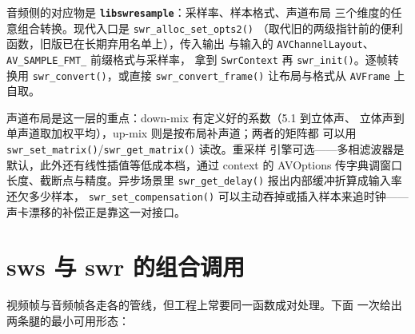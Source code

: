 \documentclass[12pt,a4paper,fontset=fandol]{ctexbook}
\newcommand{\Fn}[1]{\texttt{#1()}}
\newcommand{\Tp}[1]{\texttt{#1}}
\newcommand{\Bk}{\discretionary{}{}{}}
\newcommand{\Lib}[1]{\textbf{\texttt{#1}}}
\begin{document}
音频侧的对应物是 \Lib{libswresample}：采样率、样本格式、声道布局
三个维度的任意组合转换。现代入口是 \Fn{swr\_alloc\_set\Bk\_opts2}
（取代旧的两级指针前的便利函数，旧版已在长期弃用名单上），传入输出
与输入的 \Tp{AVChannelLayout}、\Tp{AV\_SAMPLE\_FMT\_} 前缀格式与采样率，
拿到 \Tp{SwrContext} 再 \Fn{swr\_init}。逐帧转换用
\Fn{swr\_convert}，或直接 \Fn{swr\_convert\_frame} 让布局与格式从
\Tp{AVFrame} 上自取。

声道布局是这一层的重点：down-mix 有定义好的系数（5.1 到立体声、
立体声到单声道取加权平均），up-mix 则是按布局补声道；两者的矩阵都
可以用 \Fn{swr\_{\Bk}set\_{\Bk}matrix}/{\Bk}\Fn{swr\_{\Bk}get\_{\Bk}matrix} 读改。重采样
引擎可选——多相滤波器是默认，此外还有线性插值等低成本档，通过
context 的 AVOptions 传字典调窗口长度、截断点与精度。异步场景里
\Fn{swr\_{\Bk}get\_{\Bk}delay} 报出内部缓冲折算成输入率还欠多少样本，
\Fn{swr\_{\Bk}set\_{\Bk}compensation} 可以主动吞掉或插入样本来追时钟——
声卡漂移的补偿正是靠这一对接口。

\section{sws 与 swr 的组合调用}

视频帧与音频帧各走各的管线，但工程上常要同一函数成对处理。下面
一次给出两条腿的最小可用形态：
\end{document}
